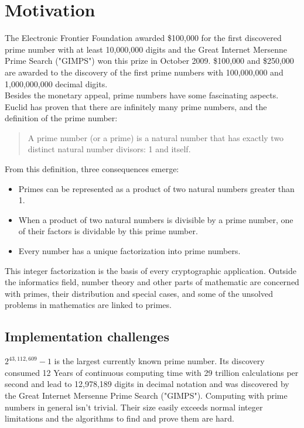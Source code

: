 \section{Motivation}
\label{sec:motivation}
 The Electronic Frontier Foundation awarded \$100,000 for the first discovered prime number with at least 10,000,000 digits and the Great Internet Mersenne Prime Search ("GIMPS") won this prize in October 2009. \$100,000 and \$250,000 are awarded to the discovery of the first prime numbers with 100,000,000 and 1,000,000,000 decimal digits.\\
Besides the monetary appeal, prime numbers have some fascinating aspects.
Euclid has proven that there are infinitely many prime numbers, and the definition of the prime number:\\
\begin{quotation}
A prime number (or a prime) is a natural number that has exactly two distinct natural number divisors: 1 and itself.
\end{quotation}
From this definition, three consequences emerge:
\begin{itemize}%
   \item Primes can be represented as a product of two natural numbers greater than 1.
   \item When a product of two natural numbers is divisible by a prime number, one of their factors is dividable by this prime number.
   \item Every number has a unique factorization into prime numbers.   
\end{itemize}%
This integer factorization is the basis of every cryptographic application. Outside the informatics field, number theory and other parts of mathematic are concerned with primes, their distribution and special cases, and some of the unsolved problems in mathematics are linked to primes.


\subsection{Implementation challenges}
\label{sec:implementation_challenges}
$2^{43,112,609}-1$ is the largest currently known prime number. Its discovery consumed 12 Years of continuous computing time with 29 trillion calculations per second and lead to 12,978,189 digits in decimal notation and was discovered by the Great Internet Mersenne Prime Search ("GIMPS").
Computing with prime numbers in general isn't trivial. Their size easily exceeds normal integer limitations and the algorithms to find and prove them are hard. 

